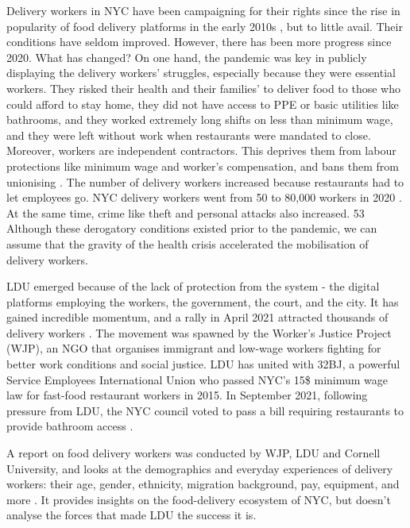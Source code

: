 \documentclass{article}
\begin{document}
Delivery workers in NYC have been campaigning for their rights since the rise in popularity of food delivery platforms in the early 2010s \parencite{TODO}, but to little avail. Their conditions have seldom improved. However, there has been more progress since 2020. What has changed? On one hand, the pandemic was key in publicly displaying the delivery workers’ struggles, especially because they were essential workers. They risked their health and their families’ to deliver food to those who could afford to stay home, they did not have access to PPE or basic utilities like bathrooms, and they worked extremely long shifts on less than minimum wage, and they were left without work when restaurants were mandated to close. 
Moreover, workers are independent contractors. This deprives them from labour protections like minimum wage and worker’s compensation, and bans them from unionising \parencite{dunn2019hustle}.
The number of delivery workers increased because restaurants had to let employees go. NYC delivery workers went from 50 to 80,000 workers in 2020 \parencite{TODO}. At the same time, crime like theft and personal attacks also increased. 53%
Although these derogatory conditions existed prior to the pandemic, we can assume that the gravity of the health crisis accelerated the mobilisation of delivery workers.

LDU emerged because of the lack of protection from the system - the digital platforms employing the workers, the government, the court, and the city. It has gained incredible momentum, and a rally in April 2021 attracted thousands of delivery workers \parencite{aponte_2021}. The movement was spawned by the Worker’s Justice Project (WJP), an NGO that organises immigrant and low-wage workers fighting for better work conditions and social justice. 
LDU has united with 32BJ, a powerful Service Employees International Union who passed NYC’s 15\$ minimum wage law for fast-food restaurant workers in 2015. In September 2021, following pressure from LDU, the NYC council voted to pass a bill requiring restaurants to provide bathroom access \parencite{vice2021bathroom}.

A report on food delivery workers was conducted by WJP, LDU and Cornell University, and looks at the demographics and everyday experiences of delivery workers: their age, gender, ethnicity, migration background, pay, equipment, and more \parencite{ldu_report2021}. It provides insights on the food-delivery ecosystem of NYC, but doesn’t analyse the forces that made LDU the success it is.
\end{document}
